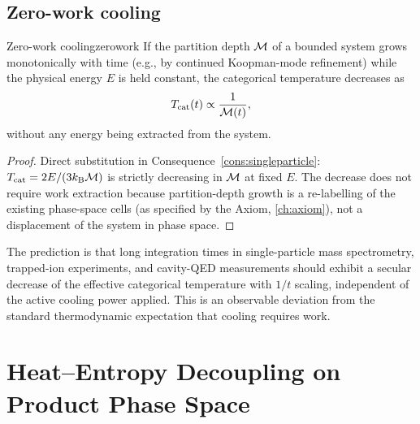 \subsection{Zero-work cooling}

\begin{consequence}{Zero-work cooling}{zerowork}
If the partition depth $\mathcal{M}$ of a bounded system grows monotonically
with time (e.g., by continued Koopman-mode refinement) while the physical
energy $E$ is held constant, the categorical temperature decreases as
\begin{equation}
  T_{\mathrm{cat}}(t) \propto \frac{1}{\mathcal{M}(t)},
  \label{eq:zerowork}
\end{equation}
without any energy being extracted from the system.
\end{consequence}

\begin{proof}
Direct substitution in Consequence~\ref{cons:singleparticle}:
$T_{\mathrm{cat}} = 2E/(3k_{\mathrm{B}}\mathcal{M})$ is strictly decreasing in $\mathcal{M}$
at fixed $E$.  The decrease does not require work extraction because
partition-depth growth is a re-labelling of the existing phase-space cells
(as specified by the Axiom, \cref{ch:axiom}), not a displacement of the
system in phase space.
\end{proof}

\begin{remark}
The prediction is that long integration times in single-particle mass
spectrometry, trapped-ion experiments, and cavity-QED measurements should
exhibit a secular decrease of the effective categorical temperature with
$1/t$ scaling, independent of the active cooling power applied.  This is an
observable deviation from the standard thermodynamic expectation that
cooling requires work.
\end{remark}

\section{Heat--Entropy Decoupling on Product Phase Space}
\label{sec:heatentropy}

